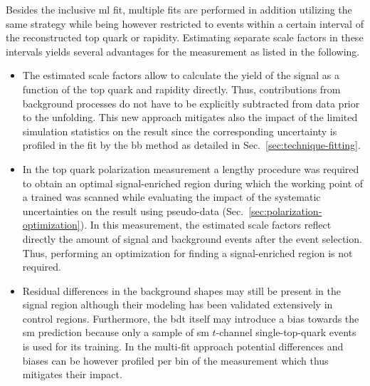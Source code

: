 

Besides the inclusive \gls{ml} fit, multiple fits are performed in addition utilizing the same strategy while being however restricted to events within a certain interval of the reconstructed top quark \pt or rapidity. Estimating separate scale factors in these intervals yields several advantages for the measurement as listed in the following.

\begin{itemize}
\item The estimated scale factors allow to calculate the yield of the signal as a function of the top quark \pt and rapidity directly. Thus, contributions from background processes do not have to be explicitly subtracted from data prior to the unfolding. This new approach mitigates also the impact of the limited simulation statistics on the result since the corresponding uncertainty is profiled in the fit by the \acrlong{bb} method as detailed in Sec.~\ref{sec:technique-fitting}.

\item In the top quark polarization measurement a lengthy procedure was required to obtain an optimal signal-enriched region during which the working point of a 
trained \bdt was scanned while evaluating the impact of the systematic uncertainties on the result using pseudo-data (Sec.~\ref{sec:polarization-optimization}). In this measurement, the estimated scale factors reflect directly the amount of signal and background events after the event selection. Thus, performing an optimization for finding a signal-enriched region is not required.

\item Residual differences in the background shapes may still be present in the signal region although their modeling has been validated extensively in control regions. Furthermore, the \gls{bdt} itself may introduce a bias towards the \gls{sm} prediction because only a sample of \gls{sm} $t$-channel single-top-quark events is used for its training. In the multi-fit approach potential differences and biases can be however profiled per bin of the measurement which thus mitigates their impact.
\end{itemize}


